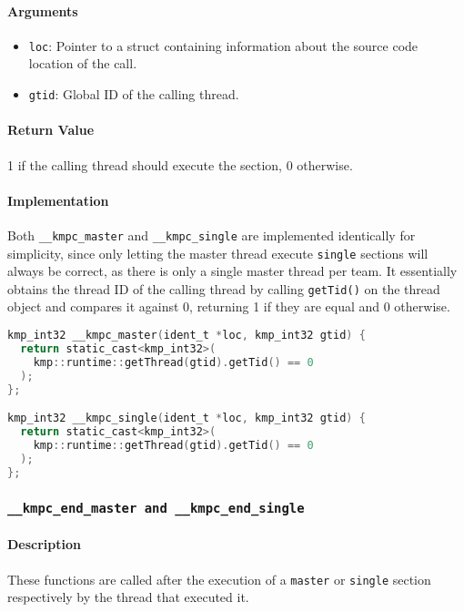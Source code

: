 \paragraph{Arguments}
\begin{itemize}
	\item \texttt{loc}: Pointer to a struct containing information about the source code location
	      of the call.
	\item \texttt{gtid}: Global ID of the calling thread.
\end{itemize}

\paragraph{Return Value} 1 if the calling thread should execute the section, 0 otherwise.

\paragraph{Implementation} Both \texttt{\_\_kmpc\_master} and \texttt{\_\_kmpc\_single} are
implemented identically for simplicity, since only letting the master thread execute \texttt{single}
sections will always be correct, as there is only a single master thread per team. It essentially
obtains the thread ID of the calling thread by calling \texttt{getTid()} on the thread object and
compares it against 0, returning 1 if they are equal and 0 otherwise.

\begin{lstlisting}[language=C, caption={__kmpc_master and __kmpc_single},
                   label={lst:kmpc-master}, escapechar=@]
kmp_int32 __kmpc_master(ident_t *loc, kmp_int32 gtid) {
  return static_cast<kmp_int32>(
    kmp::runtime::getThread(gtid).getTid() == 0
  );
};

kmp_int32 __kmpc_single(ident_t *loc, kmp_int32 gtid) {
  return static_cast<kmp_int32>(
    kmp::runtime::getThread(gtid).getTid() == 0
  );
};
\end{lstlisting}

\subsubsection{\texttt{__kmpc_end_master and __kmpc_end_single}}

\paragraph{Description} These functions are called after the execution of a \texttt{master} or
\texttt{single} section respectively by the thread that executed it.

